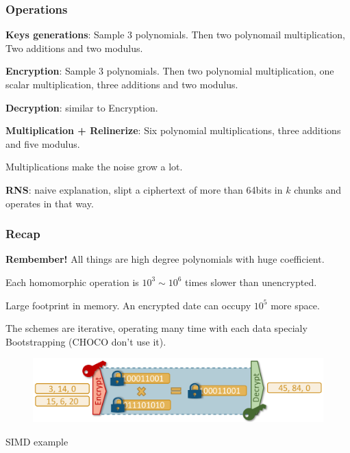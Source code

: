 \documentclass[10pt,handout]{beamer}
\begin{document}
\begin{frame}
\frametitle{Operations}

    \textbf{Keys generations}: Sample 3 polynomials. Then two polynomail multiplication, Two additions and two modulus.

    \textbf{Encryption}: Sample 3 polynomials. Then two polynomial multiplication, one scalar multiplication, three additions and two modulus.

    \textbf{Decryption}: similar to Encryption.

    \textbf{Multiplication + Relinerize}: Six polynomial multiplications, three additions and five modulus.

   Multiplications make the noise grow a lot.

    \textbf{RNS}: naive explanation, slipt a ciphertext of more than 64bits in $k$ chunks and operates in that way.

\end{frame}



\begin{frame}
\frametitle{Recap}

    \textbf{Rembember!} All things are high degree polynomials with huge coefficient.

Each homomorphic operation is $10^3 \sim 10^6$ times slower than unencrypted.
\pause

Large footprint in memory.
An encrypted date can occupy $10^5$ more space.

\pause
    The schemes are iterative, operating many time with each data specialy Bootstrapping (CHOCO don't use it).

        \begin{figure}[h!]
            \centering
            \includegraphics[scale=0.8]{workflow.png}
        \end{figure}
    \centering
        SIMD example

\end{frame}
\end{document}
